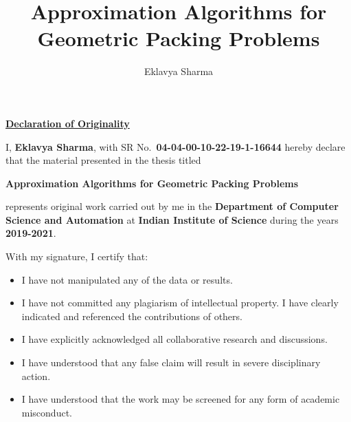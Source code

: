 
\newcommand*{\mytitle}{Approximation Algorithms for Geometric Packing Problems}
\newcommand*{\myname}{Eklavya Sharma}
\title{\mytitle}

\mtechresearch
\author{\myname}


\maketitle



\begin{center}
\LARGE{\underline{\textbf{Declaration of Originality}}}
\end{center}
\noindent I, \textbf{Eklavya Sharma}, with SR No.~\textbf{04-04-00-10-22-19-1-16644}
hereby declare that the material presented in the thesis titled
\begin{center}
\textbf{\mytitle}
\end{center}
\noindent represents original work carried out by me in the
\textbf{Department of Computer Science and Automation}
at \textbf{Indian Institute of Science}
during the years \textbf{2019-2021}.

\noindent With my signature, I certify that:
\begin{itemize}
\item I have not manipulated any of the data or results.
\item I have not committed any plagiarism of intellectual property.
    I have clearly indicated and referenced the contributions of others.
\item I have explicitly acknowledged all collaborative research and discussions.
\item I have understood that any false claim will result in severe disciplinary action.
\item I have understood that the work may be screened for any form of academic misconduct.
\end{itemize}

